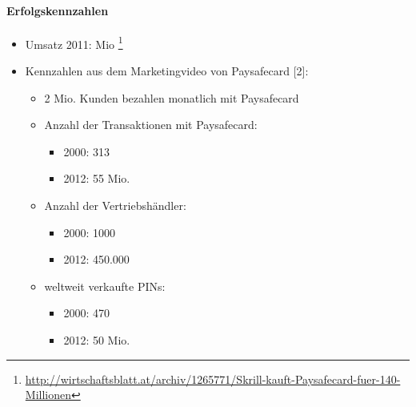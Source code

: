 \paragraph{Erfolgskennzahlen}
\begin{itemize}

	\item Umsatz 2011: Mio \footnote{\url{http://wirtschaftsblatt.at/archiv/1265771/Skrill-kauft-Paysafecard-fuer-140-Millionen}}
	\item Kennzahlen aus dem Marketingvideo von Paysafecard [2]:
	\begin{itemize}
	
	  	\item 2 Mio. Kunden bezahlen monatlich mit Paysafecard
    	\item Anzahl der Transaktionen mit Paysafecard:
    	\begin{itemize}
    	  	\item   2000: 313
    		\item   2012: 55 Mio.
    	\end{itemize}
	  
	    \item Anzahl der Vertriebshändler:
	    \begin{itemize}
	     	\item   2000: 1000
	    	\item   2012: 450.000
	    \end{itemize}
	   
	    \item weltweit verkaufte PINs:
	    \begin{itemize}
	     	\item   2000: 470 
	    	\item   2012: 50 Mio.
	    \end{itemize}
	    
	\end{itemize}
	
\end{itemize}
